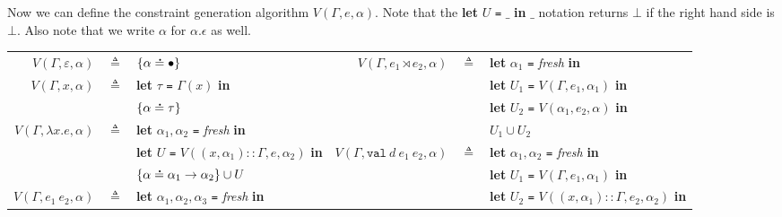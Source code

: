 \documentclass{article}
\theoremstyle{definition}
\newcommand*{\cons}{::}
\newcommand*{\A}[1]{\overset{\,_{\mbox{\Large .}}}{#1}}
\newcommand*{\modid}{d}
\newcommand*{\link}[2]{{#1}\rtimes{#2}}
\newcommand*{\Lete}{\mathtt{val}}
\begin{document}
Now we can define the constraint generation algorithm $V(\Gamma,e,\alpha)$.
Note that the \textbf{let} $U$ \texttt{=} $\_$ \textbf{in} $\_$ notation returns $\bot$ if the right hand side is $\bot$.
Also note that we write $\alpha$ for $\alpha.\epsilon$ as well.

\begin{flushright}\end{flushright}
\hspace{-2.5em}
\begin{tabular}{rclrcl}
  $V(\Gamma,\varepsilon,\alpha)$ & $\triangleq$ & $\{\alpha\A{=}\bullet\}$                                                             & $V(\Gamma,\link{e_1}{e_2},\alpha)$         & $\triangleq$ & \textbf{let} $\alpha_1$ \texttt{=} \textit{fresh} \textbf{in}                       \\
  $V(\Gamma,x,\alpha)$           & $\triangleq$ & \textbf{let} $\tau$ \texttt{=} $\Gamma(x)$ \textbf{in}                               &                                            &              & \textbf{let} $U_1$ \texttt{=} $V(\Gamma,e_1,\alpha_1)$ \textbf{in}                  \\
                                 &              & $\{\alpha\A{=}\tau\}$                                                                &                                            &              & \textbf{let} $U_2$ \texttt{=} $V(\alpha_1,e_2,\alpha)$  \textbf{in}                 \\
  $V(\Gamma,\lambda x.e,\alpha)$ & $\triangleq$ & \textbf{let} $\alpha_1,\alpha_2$ \texttt{=} \textit{fresh} \textbf{in}               &                                            &              & $U_1\cup U_2$                                                                       \\
                                 &              & \textbf{let} $U$ \texttt{=} $V((x,\alpha_1)\cons\Gamma,e,\alpha_2)$ \textbf{in}      & $V(\Gamma,\Lete\:\modid\:e_1\:e_2,\alpha)$ & $\triangleq$ & \textbf{let} $\alpha_1,\alpha_2$ \texttt{=} \textit{fresh} \textbf{in}              \\
                                 &              & $\{\alpha\A{=}\alpha_1\rightarrow\alpha_2\}\cup U$                                   &                                            &              & \textbf{let} $U_1$ \texttt{=} $V(\Gamma,e_1,\alpha_1)$ \textbf{in}                  \\
  $V(\Gamma,e_1\:e_2,\alpha)$    & $\triangleq$ & \textbf{let} $\alpha_1,\alpha_2,\alpha_3$ \texttt{=} \textit{fresh} \textbf{in}      &                                            &              & \textbf{let} $U_2$ \texttt{=} $V((x,\alpha_1)\cons\Gamma,e_2,\alpha_2)$ \textbf{in} \\

\end{tabular}
\end{document}
